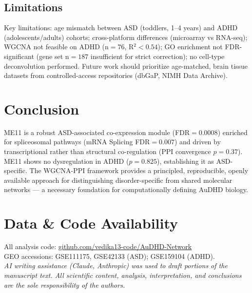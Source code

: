 \documentclass[10pt,twocolumn]{article}
\begin{document}
\subsection{Limitations}

Key limitations: age mismatch between ASD (toddlers, 1--4 years) and ADHD
(adolescents/adults) cohorts; cross-platform differences (microarray vs RNA-seq);
WGCNA not feasible on ADHD (n$=76$, R$^2<0.54$); GO enrichment not FDR-significant
(gene set n$=187$ insufficient for strict correction); no cell-type deconvolution
performed. Future work should prioritize age-matched, brain tissue datasets from
controlled-access repositories (dbGaP, NIMH Data Archive).

\section{Conclusion}

ME11 is a robust ASD-associated co-expression module (FDR$=0.0008$) enriched for
spliceosomal pathways (mRNA Splicing FDR$=0.007$) and driven by transcriptional rather
than structural co-regulation (PPI convergence $p=0.37$). ME11 shows no dysregulation
in ADHD ($p=0.825$), establishing it as ASD-specific. The WGCNA-PPI framework
provides a principled, reproducible, openly available approach for distinguishing
disorder-specific from shared molecular networks --- a necessary foundation for
computationally defining AuDHD biology.

\section*{Data \& Code Availability}

All analysis code: \url{github.com/vedika13-code/AuDHD-Network}\\
GEO accessions: GSE111175, GSE42133 (ASD); GSE159104 (ADHD).\\
\textit{AI writing assistance (Claude, Anthropic) was used to draft portions of the
manuscript text. All scientific content, analysis, interpretation, and conclusions are
the sole responsibility of the authors.}


\end{document}

